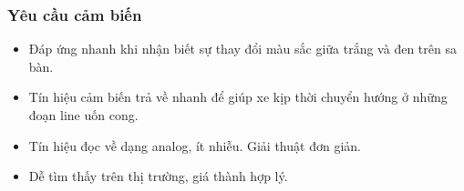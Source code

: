             \subsubsection{Yêu cầu cảm biến}
                \begin{itemize}
                    \item Đáp ứng nhanh khi nhận biết sự thay đổi màu sắc giữa trắng và đen trên sa bàn.
                    \item Tín hiệu cảm biến trả về nhanh để giúp xe kịp thời chuyển hướng ở những đoạn line uốn cong.
                    \item Tín hiệu đọc về dạng analog, ít nhiễu. Giải thuật đơn giản.
                    \item Dễ tìm thấy trên thị trường, giá thành hợp lý. 
                \end{itemize}
